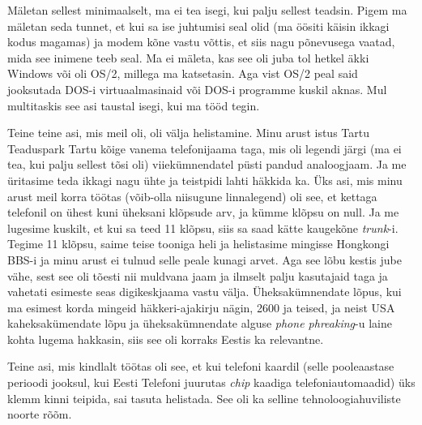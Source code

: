 Mäletan sellest minimaalselt, ma ei tea isegi, kui palju sellest teadsin. 
Pigem ma mäletan seda tunnet, et kui sa ise juhtumisi seal olid (ma öösiti 
käisin ikkagi kodus magamas)  ja  modem kõne vastu võttis, et siis nagu 
põnevusega vaatad, mida see inimene teeb seal. Ma ei mäleta, kas see oli juba 
tol hetkel äkki Windows või oli OS/2, millega ma katsetasin. Aga 
vist OS/2 peal said jooksutada DOS-i virtuaalmasinaid või  DOS-i programme 
kuskil aknas. Mul multitaskis see asi taustal isegi, kui ma tööd tegin.

Teine teine asi, mis meil oli, oli välja helistamine. Minu arust istus Tartu 
Teaduspark Tartu kõige vanema telefonijaama taga, mis 
oli legendi järgi (ma ei tea, kui palju sellest tõsi oli) viiekümnendatel püsti 
pandud analoogjaam. Ja me üritasime teda ikkagi nagu ühte ja teistpidi lahti 
häkkida ka. Üks asi, mis minu arust meil korra töötas (võib-olla niisugune 
linnalegend) oli see, et kettaga telefonil on ühest kuni üheksani klõpsude arv, 
ja kümme klõpsu on null. Ja me lugesime kuskilt, et kui sa teed 11 klõpsu, siis 
sa saad kätte kaugekõne \emph{trunk}-i. Tegime 11 klõpsu, saime teise tooniga 
heli ja helistasime mingisse Hongkongi BBS-i ja minu arust ei tulnud selle 
peale kunagi arvet. Aga see lõbu kestis jube vähe, sest see oli tõesti nii 
muldvana jaam ja ilmselt palju kasutajaid taga ja vahetati esimeste seas 
digikeskjaama vastu välja. Üheksakümnendate lõpus, kui ma esimest korda mingeid 
häkkeri-ajakirju nägin, 2600 ja teised, ja neist USA 
kaheksakümendate lõpu ja üheksakümnendate alguse \emph{phone phreaking}-u laine 
kohta lugema hakkasin,  siis see oli korraks Eestis ka relevantne. 

Teine asi, mis kindlalt töötas oli see, et kui telefoni kaardil (selle 
pooleaastase perioodi jooksul, kui Eesti Telefoni juurutas \emph{chip} kaadiga 
telefoniautomaadid) üks klemm 
kinni teipida, sai tasuta helistada. See oli ka selline tehnoloogiahuviliste 
noorte rõõm.

